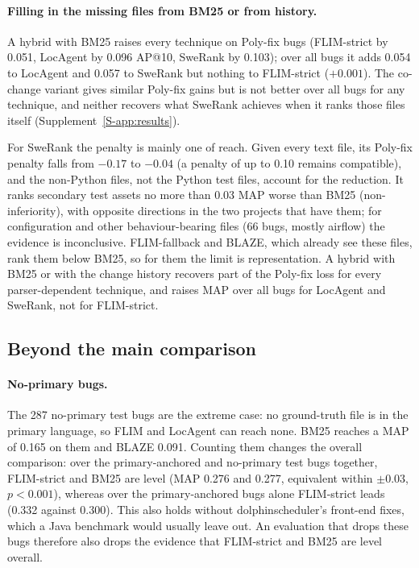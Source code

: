 \documentclass[a4paper,fleqn]{cas-dc}
\newcommand{\poly}{Poly-fix\xspace}
\begin{document}
\paragraph{Filling in the missing files from BM25 or from history.} A hybrid
with BM25 raises every technique on Poly-fix bugs (FLIM-strict by 0.051,
LocAgent by 0.096 AP@10, SweRank by 0.103); over all bugs it adds 0.054 to
LocAgent and 0.057 to SweRank but nothing to FLIM-strict ($+0.001$). The
co-change variant gives similar Poly-fix gains but is not better over all bugs
for any technique, and neither recovers what SweRank achieves when it ranks
those files itself (Supplement~\ref{S-app:results}).

\begin{tcolorbox}[title=Answer to RQ5]
For SweRank the penalty is mainly one of reach. Given every text file, its
\poly penalty falls from $-0.17$ to $-0.04$ (a penalty of up to 0.10 remains
compatible), and the non-Python files, not the Python test files, account for
the reduction. It ranks secondary test assets no more than 0.03 MAP worse than
BM25 (non-inferiority), with opposite directions
in the two projects that have them; for configuration and other
behaviour-bearing files (66 bugs, mostly airflow) the evidence is
inconclusive. FLIM-fallback and BLAZE, which already see these files, rank
them below BM25, so for them the limit is representation. A hybrid with BM25 or
with the change history recovers part of the \poly loss for every
parser-dependent technique, and raises MAP over all bugs for LocAgent and
SweRank, not for FLIM-strict.
\end{tcolorbox}

\subsection{Beyond the main comparison}\label{sec:removed}

\paragraph{No-primary bugs.} The 287 no-primary test bugs are the extreme case: no ground-truth file is in
the primary language, so FLIM and LocAgent can reach none. BM25 reaches a MAP
of 0.165 on them and BLAZE 0.091. Counting them changes the overall
comparison: over the primary-anchored and no-primary test bugs together,
FLIM-strict and BM25 are level (MAP 0.276 and 0.277, equivalent within
$\pm0.03$, $p<0.001$), whereas over the primary-anchored bugs alone
FLIM-strict leads (0.332 against 0.300). This also holds without
dolphinscheduler's front-end fixes, which a Java benchmark would usually
leave out. An evaluation that drops these bugs therefore also drops the
evidence that FLIM-strict and BM25 are level overall.
\end{document}
